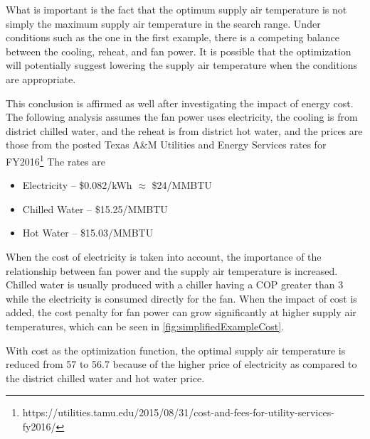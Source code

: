 What is important is the fact that the optimum supply air temperature is
not simply the maximum supply air temperature in the search range. Under
conditions such as the one in the first example, there is a competing
balance between the cooling, reheat, and fan power. It is possible that
the optimization will potentially suggest lowering the supply air
temperature when the conditions are appropriate.

This conclusion is affirmed as well after investigating the impact of
energy cost. The following analysis assumes the fan power uses 
electricity, the cooling is from district chilled water, and the reheat
is from district hot water, and the prices are those from the posted
Texas A\&M Utilities and Energy Services rates for
FY2016\footnote{https://utilities.tamu.edu/2015/08/31/cost-and-fees-for-utility-services-fy2016/}
The rates are 

\begin{itemize}
    \item Electricity -- \$0.082/kWh \(\approx\) \$24/MMBTU
    \item Chilled Water -- \$15.25/MMBTU
    \item Hot Water -- \$15.03/MMBTU
\end{itemize}

When the cost of electricity is taken into account, the importance of
the relationship between fan power and the supply air temperature is
increased. Chilled water is usually produced with a chiller having a COP
greater than 3 while the electricity is consumed directly for the fan.
When the impact of cost is added, the cost penalty for fan power can grow
significantly at higher supply air temperatures, which can be seen in
\figref{} \ref{fig:simplifiedExampleCost}. 

With cost as the optimization function, the optimal supply air
temperature is reduced from \SI{57}{\degF} to \SI{56.7}{\degF} because
of the higher price of electricity as compared to the district chilled
water and hot water price. 

